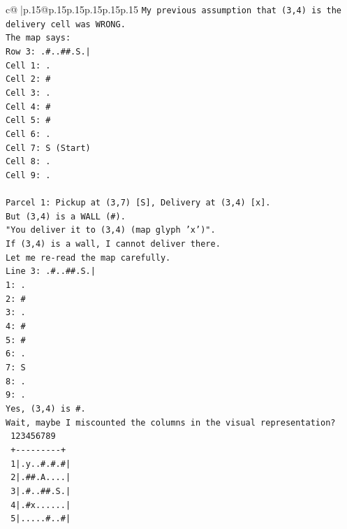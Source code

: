 \documentclass{article}
\begin{document}
{\begin{supertabular}{c@{$\;$}|p{.15\linewidth}@{}p{.15\linewidth}p{.15\linewidth}p{.15\linewidth}p{.15\linewidth}p{.15\linewidth}}
{{{\texttt{My previous assumption that (3,4) is the delivery cell was WRONG.} \\
\texttt{The map says:} \\
\texttt{Row 3: .\#..\#\#.S.|} \\
\texttt{Cell 1: .} \\
\texttt{Cell 2: \#} \\
\texttt{Cell 3: .} \\
\texttt{Cell 4: \#} \\
\texttt{Cell 5: \#} \\
\texttt{Cell 6: .} \\
\texttt{Cell 7: S (Start)} \\
\texttt{Cell 8: .} \\
\texttt{Cell 9: .} \\
\\ 
\texttt{Parcel 1: Pickup at (3,7) {[}S{]}, Delivery at (3,4) {[}x{]}.} \\
\texttt{But (3,4) is a WALL (\#).} \\
\texttt{"You deliver it to (3,4) (map glyph 'x')".} \\
\texttt{If (3,4) is a wall, I cannot deliver there.} \\
\texttt{Let me re{-}read the map carefully.} \\
\texttt{Line 3: .\#..\#\#.S.|} \\
\texttt{1: .} \\
\texttt{2: \#} \\
\texttt{3: .} \\
\texttt{4: \#} \\
\texttt{5: \#} \\
\texttt{6: .} \\
\texttt{7: S} \\
\texttt{8: .} \\
\texttt{9: .} \\
\texttt{Yes, (3,4) is \#.} \\
\texttt{Wait, maybe I miscounted the columns in the visual representation?} \\
\texttt{   123456789} \\
\texttt{  +{-}{-}{-}{-}{-}{-}{-}{-}{-}+} \\
\texttt{ 1|.y..\#.\#.\#|} \\
\texttt{ 2|.\#\#.A....|} \\
\texttt{ 3|.\#..\#\#.S.|} \\
\texttt{ 4|.\#x......|} \\
\texttt{ 5|.....\#..\#|} \\
}}}
\end{supertabular}}
\end{document}
